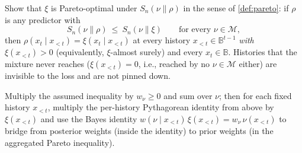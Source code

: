 \documentclass[fontsize=11pt, parskip=half]{scrartcl}
\newcommand{\Mc}{\mathcal{M}}
\newcommand{\Sn}[2]{S_{n}(#1 \parallel #2)}
\begin{document}
\begin{exercise}
\label{prob:sq_pareto}



Show that $\xi$ is Pareto-optimal under $\Sn{\nu}{\rho}$ in the sense of \cref{def:pareto}: if $\rho$ is any predictor with
\[
  \Sn{\nu}{\rho} ~\leq~ \Sn{\nu}{\xi} \qquad \text{for every } \nu \in \Mc,
\]
then $\rho(x_t \mid x_{<t}) = \xi(x_t \mid x_{<t})$ at every history $x_{<t} \in
\mathbb{B}^{t-1}$ \emph{with $\xi(x_{<t}) > 0$} (equivalently, $\xi$-almost
surely) and every $x_t \in \mathbb{B}$. Histories that the mixture never reaches
($\xi(x_{<t}) = 0$, i.e., reached by no $\nu \in \Mc$ either) are invisible
to the loss and are not pinned down.

\begin{hint}
Multiply the assumed inequality by $w_\nu \geq 0$ and sum over
$\nu$; then for each fixed history $x_{<t}$, multiply the per-history
Pythagorean identity from above by $\xi(x_{<t})$ and use the Bayes identity
$w(\nu \mid x_{<t})\,\xi(x_{<t}) = w_\nu \,\nu(x_{<t})$ to bridge from posterior
weights (inside the identity) to prior weights (in the aggregated Pareto
inequality).
\end{hint}
\end{exercise}
\end{document}
